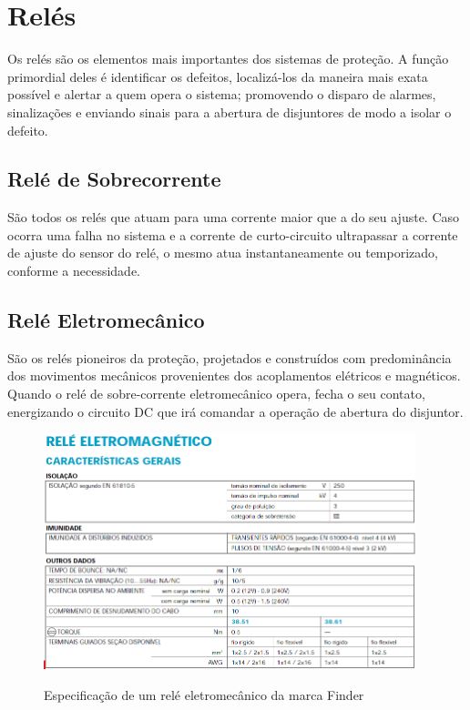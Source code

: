 \documentclass[a5paper,english,spanish,brazil]{ufsc-thesis}
\begin{document}
\section{Relés}
Os relés são os elementos mais importantes dos sistemas de proteção. A função primordial deles é identificar os defeitos, localizá-los da maneira mais exata possível e alertar a quem opera o sistema; promovendo o disparo de alarmes, sinalizações e enviando sinais para a abertura de disjuntores de modo a isolar o defeito.\par

\subsection{Relé de Sobrecorrente}
São todos os relés que atuam para uma corrente maior que a do seu ajuste. Caso ocorra uma falha no sistema e a corrente de curto-circuito ultrapassar a corrente de ajuste do sensor do relé, o mesmo atua instantaneamente ou temporizado, conforme a necessidade.\par

\subsection{Relé Eletromecânico}
São os relés pioneiros da proteção, projetados e construídos com predominância dos movimentos mecânicos provenientes dos acoplamentos elétricos e magnéticos. Quando o relé de sobre-corrente eletromecânico opera, fecha o seu contato, energizando o circuito DC que irá comandar a operação de abertura do disjuntor.\par

\begin{figure}[htb]
  \caption{Especificação de um relé eletromecânico da marca Finder}
  \centering
  \includegraphics[width=10.8cm]{eletromag.jpg}
  \label{fig:eletromag}
\end{figure}
\end{document}
